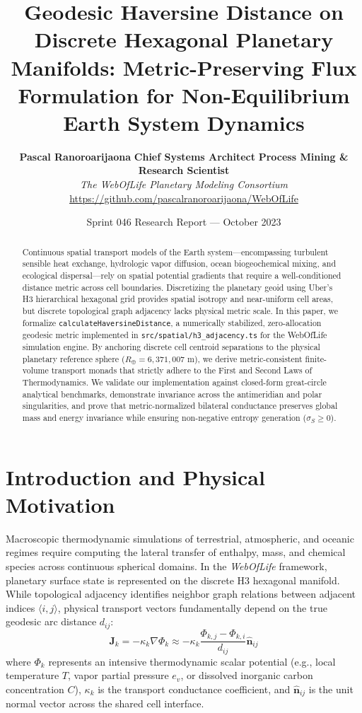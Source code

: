\documentclass[11pt,a4paper]{article}
\title{\textbf{Geodesic Haversine Distance on Discrete Hexagonal Planetary Manifolds: Metric-Preserving Flux Formulation for Non-Equilibrium Earth System Dynamics}}
\author{
    \textbf{Pascal Ranoroarijaona} \quad \textbf{Chief Systems Architect} \quad \textbf{Process Mining \& Research Scientist} \\
    \textit{The WebOfLife Planetary Modeling Consortium} \\
    \url{https://github.com/pascalranoroarijaona/WebOfLife}
}
\date{Sprint 046 Research Report --- October 2023}
\begin{document}
\maketitle

\begin{abstract}
Continuous spatial transport models of the Earth system---encompassing turbulent sensible heat exchange, hydrologic vapor diffusion, ocean biogeochemical mixing, and ecological dispersal---rely on spatial potential gradients that require a well-conditioned distance metric across cell boundaries. Discretizing the planetary geoid using Uber's H3 hierarchical hexagonal grid provides spatial isotropy and near-uniform cell areas, but discrete topological graph adjacency lacks physical metric scale. In this paper, we formalize \texttt{calculateHaversineDistance}, a numerically stabilized, zero-allocation geodesic metric implemented in \texttt{src/spatial/h3\_adjacency.ts} for the WebOfLife simulation engine. By anchoring discrete cell centroid separations to the physical planetary reference sphere ($R_\oplus = 6,371,007\text{ m}$), we derive metric-consistent finite-volume transport monads that strictly adhere to the First and Second Laws of Thermodynamics. We validate our implementation against closed-form great-circle analytical benchmarks, demonstrate invariance across the antimeridian and polar singularities, and prove that metric-normalized bilateral conductance preserves global mass and energy invariance while ensuring non-negative entropy generation ($\sigma_S \ge 0$).
\end{abstract}

\section{Introduction and Physical Motivation}

Macroscopic thermodynamic simulations of terrestrial, atmospheric, and oceanic regimes require computing the lateral transfer of enthalpy, mass, and chemical species across continuous spherical domains. In the \textit{WebOfLife} framework, planetary surface state is represented on the discrete H3 hexagonal manifold. While topological adjacency identifies neighbor graph relations between adjacent indices $\langle i, j \rangle$, physical transport vectors fundamentally depend on the true geodesic arc distance $d_{ij}$:
\begin{equation}
    \mathbf{J}_k = -\kappa_k \nabla \Phi_k \approx -\kappa_k \frac{\Phi_{k, j} - \Phi_{k, i}}{d_{ij}} \hat{\mathbf{n}}_{ij}
    \label{eq:gradient_flux}
\end{equation}
where $\Phi_k$ represents an intensive thermodynamic scalar potential (e.g., local temperature $T$, vapor partial pressure $e_v$, or dissolved inorganic carbon concentration $C$), $\kappa_k$ is the transport conductance coefficient, and $\hat{\mathbf{n}}_{ij}$ is the unit normal vector across the shared cell interface.
\end{document}
